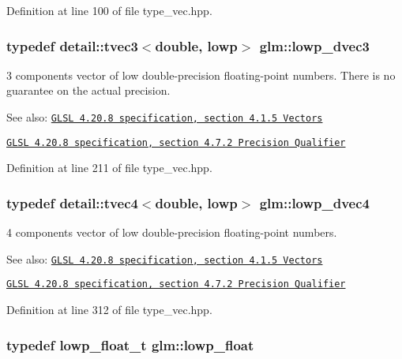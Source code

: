 Definition at line 100 of file type\_\-vec.hpp.\hypertarget{group__core__precision_g9bdb864f7242863e1227e3209f5b2dc4}{
\subsubsection[lowp\_\-dvec3]{\setlength{\rightskip}{0pt plus 5cm}typedef detail::tvec3$<$double, lowp$>$ {\bf glm::lowp\_\-dvec3}}}
\label{group__core__precision_g9bdb864f7242863e1227e3209f5b2dc4}


3 components vector of low double-precision floating-point numbers. There is no guarantee on the actual precision.

\begin{Desc}
\item[See also:]\href{http://www.opengl.org/registry/doc/GLSLangSpec.4.20.8.pdf}{\tt GLSL 4.20.8 specification, section 4.1.5 Vectors} 

\href{http://www.opengl.org/registry/doc/GLSLangSpec.4.20.8.pdf}{\tt GLSL 4.20.8 specification, section 4.7.2 Precision Qualifier} \end{Desc}


Definition at line 211 of file type\_\-vec.hpp.\hypertarget{group__core__precision_gd04432e5d5accf764e10c6674e5d0c96}{
\subsubsection[lowp\_\-dvec4]{\setlength{\rightskip}{0pt plus 5cm}typedef detail::tvec4$<$double, lowp$>$ {\bf glm::lowp\_\-dvec4}}}
\label{group__core__precision_gd04432e5d5accf764e10c6674e5d0c96}


4 components vector of low double-precision floating-point numbers.

\begin{Desc}
\item[See also:]\href{http://www.opengl.org/registry/doc/GLSLangSpec.4.20.8.pdf}{\tt GLSL 4.20.8 specification, section 4.1.5 Vectors} 

\href{http://www.opengl.org/registry/doc/GLSLangSpec.4.20.8.pdf}{\tt GLSL 4.20.8 specification, section 4.7.2 Precision Qualifier} \end{Desc}


Definition at line 312 of file type\_\-vec.hpp.\hypertarget{group__core__precision_g2887fbc729ac5c1c5caeb7cd57a7145c}{
\subsubsection[lowp\_\-float]{\setlength{\rightskip}{0pt plus 5cm}typedef lowp\_\-float\_\-t {\bf glm::lowp\_\-float}}}
\label{group__core__precision_g2887fbc729ac5c1c5caeb7cd57a7145c}



